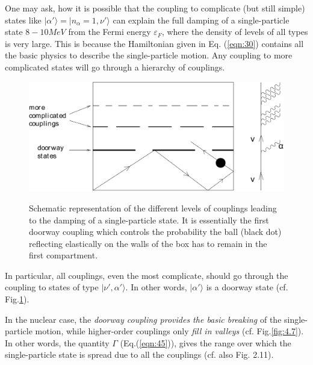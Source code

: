 \documentclass[a4paper,14pt]{book}
\begin{document}
One may ask, how it is possible that the coupling to complicate (but still simple) states like $|\alpha'\rangle = |n_\alpha = 1,\nu'\rangle$ can explain the full damping of a single-particle state $8-10 MeV$ from the Fermi energy $\varepsilon_F$, where the density of levels of all types is very large. This is because the Hamiltonian given in Eq. (\ref{eqn:30}) contains all the basic physics to describe the single-particle motion. Any coupling to more complicated states will go through a hierarchy of couplings.
\begin{figure}[h!]
\centerline {
{\includegraphics*[width=\textwidth]{figs_C4S/fig_4_6}}
}
\caption{Schematic representation of the different levels of couplings leading to the damping of a single-particle state. It is essentially the first doorway coupling which controls the probability the ball (black dot) reflecting elastically on the walls of the box has to remain in the first compartment.}
\label{fig:4.6}
\end{figure}
In particular, all couplings, even the most complicate, should go through the coupling to states of type $|\nu',\alpha'\rangle$. In other words, $|\alpha'\rangle$ is a doorway state (cf. Fig.\ref{fig:4.6}).

In the nuclear case, the {\it doorway coupling provides the basic breaking} of the single-particle motion, while higher-order couplings only {\it fill in valleys} (cf. Fig.\ref{fig:4.7}).
In other words, the quantity $\Gamma$ (Eq.(\ref{eqn:45})), gives the range over which the single-particle state is spread due to all the couplings (cf. also Fig. 2.11).
\end{document}
